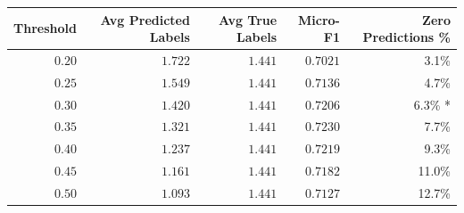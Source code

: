 \begin{tabular}{rrrrr}
\toprule
Threshold & Avg Predicted Labels & Avg True Labels & Micro-F1 & Zero Predictions \% \\
\midrule
$0.20$ & $1.722$ & $1.441$ & $0.7021$ & 3.1\% \\
$0.25$ & $1.549$ & $1.441$ & $0.7136$ & 4.7\% \\
$0.30$ & $1.420$ & $1.441$ & $0.7206$ & 6.3\% * \\
$0.35$ & $1.321$ & $1.441$ & $0.7230$ & 7.7\% \\
$0.40$ & $1.237$ & $1.441$ & $0.7219$ & 9.3\% \\
$0.45$ & $1.161$ & $1.441$ & $0.7182$ & 11.0\% \\
$0.50$ & $1.093$ & $1.441$ & $0.7127$ & 12.7\% \\
\bottomrule
\end{tabular}
